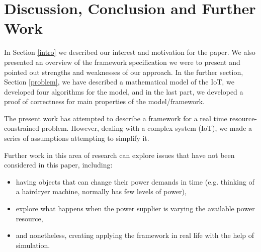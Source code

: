\documentclass[letterpaper, 10 pt, conference]{ieeeconf}
\begin{document}
\section{Discussion, Conclusion and Further Work} \label{discussion}
In Section \ref{intro} we described our interest and motivation for the paper. We also presented an overview of the framework specification we were to present and pointed out strengths and weaknesses of our approach. In the further section, Section \ref{problem}, we have described a mathematical model of the IoT, we developed four algorithms for the model, and in the last part, we developed a proof of correctness for main properties of the model/framework.

The present work has attempted to describe a framework for a real time resource-constrained problem. However, dealing with a complex system (IoT), we made a series of assumptions attempting to simplify it.

Further work in this area of research can explore issues that have not been considered in this paper, including:
\begin{itemize}
    \item having objects that can change their power demands in time (e.g. thinking of a hairdryer machine, normally has few levels of power),
    \item explore what happens when the power supplier is varying the available power resource,
    \item and nonetheless, creating applying the framework in real life with the help of simulation.
\end{itemize}


%



\end{document}
